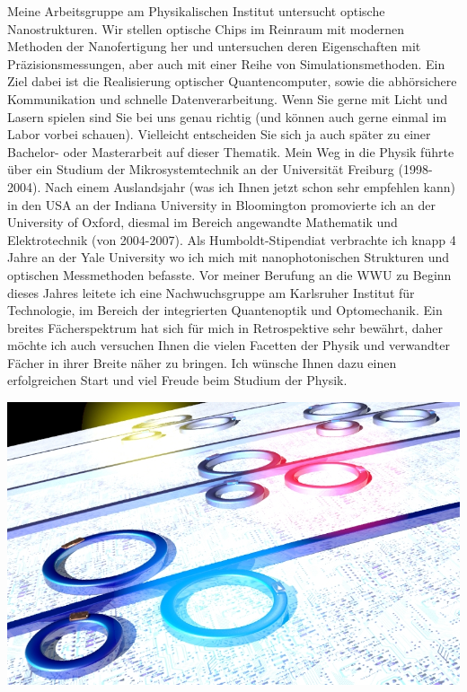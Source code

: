\begin{multicols}{2}
Meine Arbeitsgruppe am Physikalischen Institut untersucht optische Nanostrukturen. Wir stellen optische Chips im Reinraum mit modernen Methoden der Nanofertigung her und untersuchen deren Eigenschaften mit Präzisionsmessungen, aber auch mit einer Reihe von Simulationsmethoden. Ein Ziel dabei ist die Realisierung optischer Quantencomputer, sowie die abhörsichere Kommunikation und schnelle Datenverarbeitung. Wenn Sie gerne mit Licht und Lasern spielen sind Sie bei uns genau richtig (und können auch gerne einmal im Labor vorbei schauen). Vielleicht entscheiden Sie sich ja auch später zu einer Bachelor- oder Masterarbeit auf dieser Thematik.
Mein Weg in die Physik führte über ein Studium der Mikrosystemtechnik an der Universität Freiburg (1998-2004). Nach einem Auslandsjahr (was ich Ihnen jetzt schon sehr empfehlen kann) in den USA an der Indiana University in Bloomington promovierte ich an der University of Oxford, diesmal im Bereich angewandte Mathematik und Elektrotechnik (von 2004-2007). Als Humboldt-Stipendiat verbrachte ich knapp 4 Jahre an der Yale University wo ich mich mit nanophotonischen Strukturen und optischen Messmethoden befasste. Vor meiner Berufung an die WWU zu Beginn dieses Jahres leitete ich eine Nachwuchsgruppe am Karlsruher Institut für Technologie, im Bereich der integrierten Quantenoptik und Optomechanik.
Ein breites Fächerspektrum hat sich für mich in Retrospektive sehr bewährt, daher möchte ich auch versuchen Ihnen die vielen Facetten der Physik und verwandter Fächer in ihrer Breite näher zu bringen. Ich wünsche Ihnen dazu einen erfolgreichen Start und viel Freude beim Studium der Physik.

\includegraphics[width=\columnwidth]{res/pernice_illustration.jpg}
\end{multicols}

